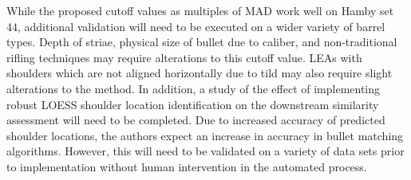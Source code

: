 \documentclass[12pt]{article}
\begin{document}
While the proposed cutoff values as multiples of MAD work well on Hamby
set 44, additional validation will need to be executed on a wider
variety of barrel types. Depth of striae, physical size of bullet due to
caliber, and non-traditional rifling techniques may require alterations
to this cutoff value. LEAs with shoulders which are not aligned
horizontally due to tild may also require slight alterations to the
method. In addition, a study of the effect of implementing robust LOESS
shoulder location identification on the downstream similarity assessment
will need to be completed. Due to increased accuracy of predicted
shoulder locations, the authors expect an increase in accuracy in bullet
matching algorithms. However, this will need to be validated on a
variety of data sets prior to implementation without human intervention
in the automated process.



\end{document}
